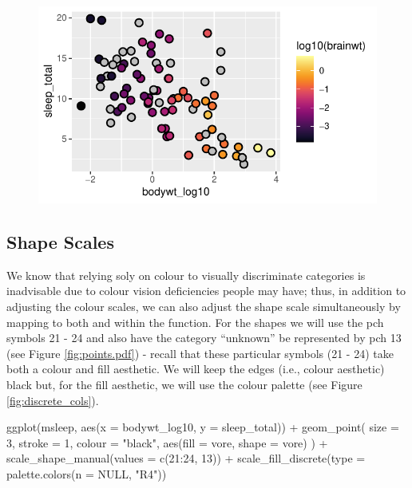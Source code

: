 \vspace{2em}

\begin{figure}[H]
\includegraphics[scale = .75]{graphics/ch2Figs/ggEx_29.pdf}
\end{figure}

\subsection{Shape Scales}

We know that relying soly on colour to visually discriminate categories is inadvisable due to colour vision deficiencies people may have; thus, in addition to adjusting the colour scales, we can also adjust the shape scale simultaneously by mapping  to both  and  within the  function. For the shapes we will use the pch symbols 21 - 24 and also have the category ``unknown'' be represented by pch 13 (see Figure \ref{fig:points.pdf}) - recall that these particular symbols (21 - 24) take both a colour and fill aesthetic. We will keep the edges (i.e., colour aesthetic) black but, for the fill aesthetic, we will use the  colour palette (see Figure \ref{fig:discrete_cols}).

\begin{inR}
ggplot(msleep, aes(x = bodywt_log10, y = sleep_total)) +
  geom_point(
    size = 3, stroke = 1, colour = "black",
    aes(fill = vore, shape = vore)
  ) +
  scale_shape_manual(values = c(21:24, 13)) +
  scale_fill_discrete(type = palette.colors(n = NULL, "R4"))
\end{inR}

\vspace{2em}

